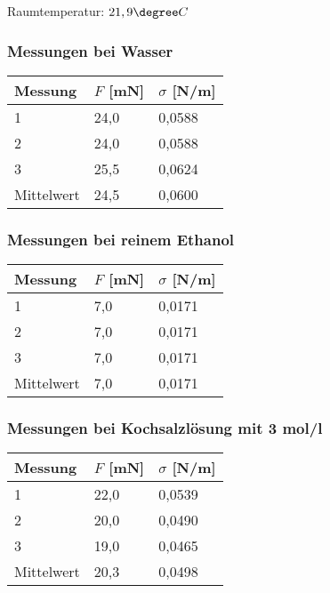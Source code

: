 \documentclass{scrartcl}
\begin{document}
Raumtemperatur: $21,9 \degree C$
\subsubsection{Messungen bei Wasser}

\begin{table}[H]
\begin{center}
\begin{tabular}{l|l|l}
Messung    & $F$ {[}mN{]} & $\sigma$ {[}N/m{]} \\
\hline
1          & 24,0       & 0,0588    \\
2          & 24,0       & 0,0588    \\
3          & 25,5       & 0,0624    \\
Mittelwert & 24,5       & 0,0600                    
\end{tabular}
\end{center}
\label{tab:Wasser}
\end{table}
\subsubsection{Messungen bei reinem Ethanol}

\begin{table}[H]
\begin{center}
\begin{tabular}{l|l|l}
Messung    & $F$ {[}mN{]} & $\sigma$ {[}N/m{]} \\
\hline
1          & 7,0       & 0,0171    \\
2          & 7,0       & 0,0171    \\
3          & 7,0       & 0,0171    \\
Mittelwert & 7,0       & 0,0171                    
\end{tabular}
\end{center}
\label{tab:Ethanol}
\end{table}
\subsubsection{Messungen bei Kochsalzlösung mit 3 mol/l}

\begin{table}[H]
\begin{center}
\begin{tabular}{l|l|l}
Messung    & $F$ {[}mN{]} & $\sigma$ {[}N/m{]} \\
\hline
1          & 22,0       & 0,0539    \\
2          & 20,0       & 0,0490    \\
3          & 19,0       & 0,0465    \\
Mittelwert & 20,3       & 0,0498                    
\end{tabular}
\end{center}
\label{tab:Kochsalz}
\end{table}
\end{document}
